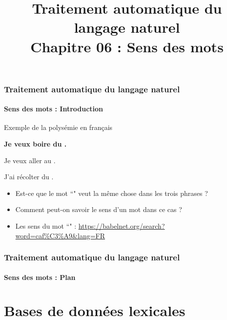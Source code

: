 \documentclass[xcolor=table]{beamer}
\title[TALN : 06- Sens des mots]%
{Traitement automatique du langage naturel\\Chapitre 06 : Sens des mots}
\begin{document}
	
\begin{frame}
\frametitle{Traitement automatique du langage naturel}
\framesubtitle{Sens des mots : Introduction}

\begin{exampleblock}{Exemple de la polysémie en français}
	\begin{center}
		\Large\bfseries
			Je veux boire du .
			
			Je veux aller au .
			
			J'ai récolter du .
	\end{center}
\end{exampleblock}

\begin{itemize}
	\item Est-ce que le mot ``" veut la même chose dans les trois phrases ?
	\item Comment peut-on savoir le sens d'un mot dans ce cas ?
	\item Les sens du mot ``" : \url{https://babelnet.org/search?word=caf\%C3\%A9&lang=FR}
\end{itemize}

\end{frame}

%
%

\begin{frame}
\frametitle{Traitement automatique du langage naturel}
\framesubtitle{Sens des mots : Plan}

\begin{multicols}{2}
\tableofcontents
\end{multicols}
\end{frame}

\section{Bases de données lexicales}
\end{document}
